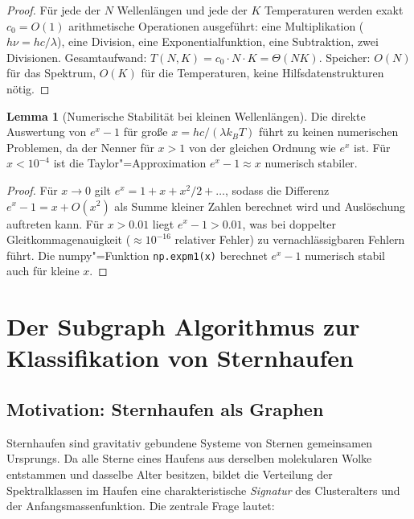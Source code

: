 ﻿\documentclass[a4paper,12pt]{article}
\theoremstyle{definition}
\newtheorem{lemma}{Lemma}
\begin{document}
\begin{proof}
    Für jede der $N$ Wellenlängen und jede der $K$ Temperaturen werden
    exakt $c_0 = O(1)$ arithmetische Operationen ausgeführt:
    eine Multiplikation ($h\nu = hc/\lambda$), eine Division, eine
    Exponentialfunktion, eine Subtraktion, zwei Divisionen.
    Gesamtaufwand: $T(N,K) = c_0 \cdot N \cdot K = \Theta(NK)$.
    Speicher: $O(N)$ für das Spektrum, $O(K)$ für die Temperaturen,
    keine Hilfsdatenstrukturen nötig. \qedhere
\end{proof}

\begin{lemma}[Numerische Stabilität bei kleinen Wellenlängen]
    Die direkte Auswertung von $e^x - 1$ für große $x = hc/(\lambda k_BT)$
    führt zu keinen numerischen Problemen, da der Nenner für $x > 1$
    von der gleichen Ordnung wie $e^x$ ist. Für $x < 10^{-4}$
    ist die Taylor"=Approximation $e^x - 1 \approx x$ numerisch stabiler.
\end{lemma}

\begin{proof}
    Für $x \to 0$ gilt $e^x = 1 + x + x^2/2 + \ldots$, sodass
    die Differenz $e^x - 1 = x + O(x^2)$ als Summe kleiner Zahlen
    berechnet wird und Auslöschung auftreten kann.
    Für $x > 0.01$ liegt $e^x - 1 > 0.01$, was bei doppelter
    Gleitkommagenauigkeit ($\approx 10^{-16}$ relativer Fehler) zu
    vernachlässigbaren Fehlern führt. Die numpy"=Funktion
    \texttt{np.expm1(x)} berechnet $e^x - 1$ numerisch stabil
    auch für kleine $x$. \qedhere
\end{proof}

\section{Der Subgraph Algorithmus zur Klassifikation von Sternhaufen}

\subsection{Motivation: Sternhaufen als Graphen}

Sternhaufen sind gravitativ gebundene Systeme von Sternen gemeinsamen Ursprungs.
Da alle Sterne eines Haufens aus derselben molekularen Wolke entstammen und
dasselbe Alter besitzen, bildet die Verteilung der Spektralklassen im Haufen
eine charakteristische \emph{Signatur} des Clusteralters und der
Anfangsmassenfunktion. Die zentrale Frage lautet:
\end{document}
